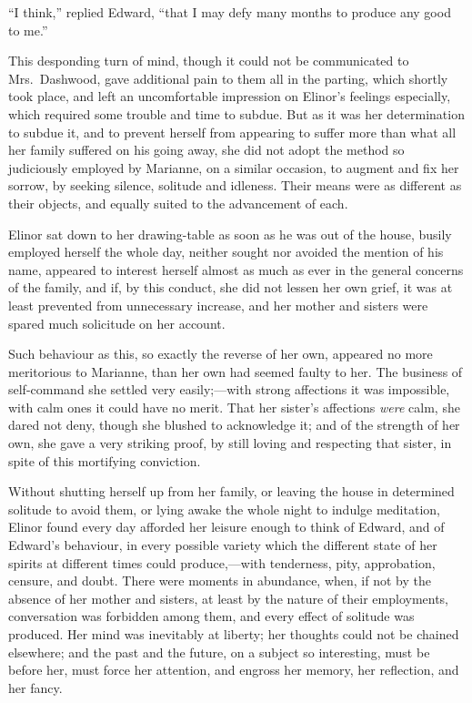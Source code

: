 \documentclass{article}
\begin{document}
``I think,'' replied Edward, ``that I may defy many
months to produce any good to me.''

This desponding turn of mind, though it could not
be communicated to Mrs.\ Dashwood, gave additional pain
to them all in the parting, which shortly took place,
and left an uncomfortable impression on Elinor's
feelings especially, which required some trouble and time
to subdue.  But as it was her determination to subdue it,
and to prevent herself from appearing to suffer more than
what all her family suffered on his going away, she did
not adopt the method so judiciously employed by Marianne,
on a similar occasion, to augment and fix her sorrow,
by seeking silence, solitude and idleness.  Their means
were as different as their objects, and equally suited
to the advancement of each.

Elinor sat down to her drawing-table as soon as he
was out of the house, busily employed herself the whole day,
neither sought nor avoided the mention of his name,
appeared to interest herself almost as much as ever in the
general concerns of the family, and if, by this conduct,
she did not lessen her own grief, it was at least prevented
from unnecessary increase, and her mother and sisters
were spared much solicitude on her account.

Such behaviour as this, so exactly the reverse
of her own, appeared no more meritorious to Marianne,
than her own had seemed faulty to her.  The business
of self-command she settled very easily;---with strong
affections it was impossible, with calm ones it could
have no merit.  That her sister's affections \emph{were} calm,
she dared not deny, though she blushed to acknowledge it;
and of the strength of her own, she gave a very striking proof,
by still loving and respecting that sister, in spite
of this mortifying conviction.

Without shutting herself up from her family,
or leaving the house in determined solitude to avoid them,
or lying awake the whole night to indulge meditation,
Elinor found every day afforded her leisure enough
to think of Edward, and of Edward's behaviour, in every
possible variety which the different state of her spirits
at different times could produce,---with tenderness,
pity, approbation, censure, and doubt.  There were moments
in abundance, when, if not by the absence of her mother
and sisters, at least by the nature of their employments,
conversation was forbidden among them, and every effect
of solitude was produced.  Her mind was inevitably
at liberty; her thoughts could not be chained elsewhere;
and the past and the future, on a subject so interesting,
must be before her, must force her attention, and engross
her memory, her reflection, and her fancy.
\end{document}
